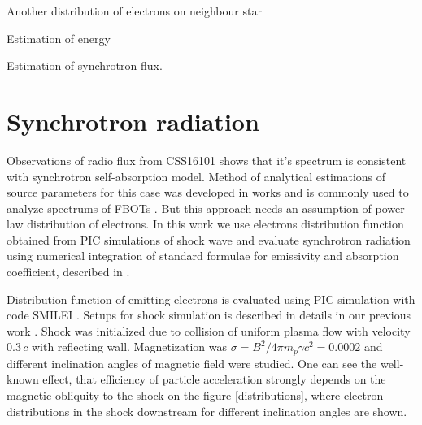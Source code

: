 \documentclass{article}
\begin{document}
	Another distribution of electrons on neighbour star
	
	Estimation of energy
	
	Estimation of synchrotron flux.
	
	\section{Synchrotron radiation}\label{synchrotronChapter}
	Observations of radio flux from CSS16101 \cite{Coppejans2020} shows that it's spectrum is consistent with synchrotron self-absorption model. Method of analytical estimations of source parameters for this case was developed in works \cite{Chevalier1998, ChevalierFransson} and is commonly used to analyze spectrums of FBOTs \cite{Ho2019cow, Ho2020koala, Coppejans2020, Ho2021at2020}. But this approach needs an assumption of power-law distribution of electrons. In this work we use electrons distribution function obtained from PIC simulations of shock wave and evaluate synchrotron radiation using numerical integration of standard formulae for emissivity and absorption coefficient, described in \cite{Ginzburg1975, Ghisellini}.
	
	Distribution function of emitting electrons is evaluated using PIC simulation with code SMILEI \cite{Derouillat}. Setups for shock simulation is described in details in our previous work \cite{BykovUniverse}. Shock was initialized due to collision of uniform plasma flow with velocity $0.3\,c$ with reflecting wall. Magnetization was $\sigma = B^2/4 \pi m_p \gamma c^2 = 0.0002$ and different inclination angles of magnetic field were studied. One can see the well-known effect, that efficiency of particle acceleration strongly depends on the magnetic obliquity to the shock \cite{SironiSpitkovsky2009pair, Crumley2019, GuoSironi2014_1, Romansky2018} on the figure \ref{distributions}, where electron distributions in the shock downstream for different inclination angles are shown.
	
\end{document}

